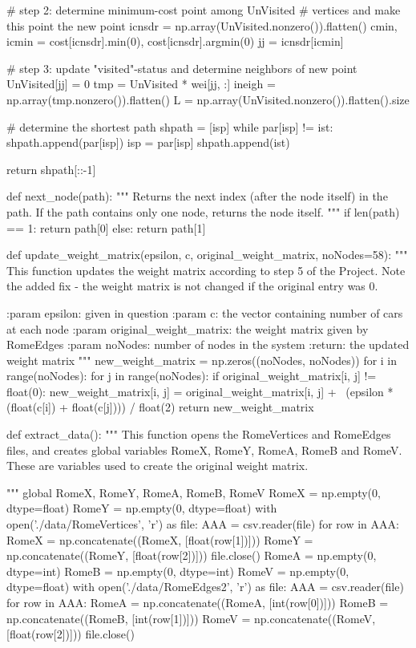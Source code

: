 \documentclass[paper=a4, fontsize=12pt]{scrartcl} %
\numberwithin{equation}{section}       %
\numberwithin{figure}{section}         %
\numberwithin{table}{section}          %
\begin{document}
\begin{python}
        # step 2: determine minimum-cost point among UnVisited
        #         vertices and make this point the new point
        icnsdr = np.array(UnVisited.nonzero()).flatten()
        cmin, icmin = cost[icnsdr].min(0), cost[icnsdr].argmin(0)
        jj = icnsdr[icmin]

        # step 3: update "visited"-status and determine neighbors of new point
        UnVisited[jj] = 0
        tmp = UnVisited * wei[jj, :]
        ineigh = np.array(tmp.nonzero()).flatten()
        L = np.array(UnVisited.nonzero()).flatten().size

    # determine the shortest path
    shpath = [isp]
    while par[isp] != ist:
        shpath.append(par[isp])
        isp = par[isp]
    shpath.append(ist)

    return shpath[::-1]

def next_node(path):
    """ Returns the next index (after the node itself) in the path.
        If the path contains only one node, returns the node itself.
    """
    if len(path) == 1:
        return path[0]
    else:
        return path[1]


def update_weight_matrix(epsilon, c, original_weight_matrix, noNodes=58):
    """
    This function updates the weight matrix according to step 5 of the
    Project. Note the added fix - the weight matrix is not changed if
    the original entry was 0.



    :param epsilon: given in question
    :param c: the vector containing number of cars at each node
    :param original_weight_matrix: the weight matrix given by RomeEdges
    :param noNodes: number of nodes in the system
    :return: the updated weight matrix
    """
    new_weight_matrix = np.zeros((noNodes, noNodes))
    for i in range(noNodes):
        for j in range(noNodes):
            if original_weight_matrix[i, j] != float(0):
                new_weight_matrix[i, j] = original_weight_matrix[i, j] + \
                                          (epsilon * (float(c[i]) +
                                                      float(c[j]))) / float(2)
    return new_weight_matrix


def extract_data():
    """
    This function opens the RomeVertices and RomeEdges files, and creates
    global variables RomeX, RomeY, RomeA, RomeB and RomeV. These are variables
    used to create the original weight matrix.

    """
    global RomeX, RomeY, RomeA, RomeB, RomeV
    RomeX = np.empty(0, dtype=float)
    RomeY = np.empty(0, dtype=float)
    with open('./data/RomeVertices', 'r') as file:
        AAA = csv.reader(file)
        for row in AAA:
            RomeX = np.concatenate((RomeX, [float(row[1])]))
            RomeY = np.concatenate((RomeY, [float(row[2])]))
    file.close()
    RomeA = np.empty(0, dtype=int)
    RomeB = np.empty(0, dtype=int)
    RomeV = np.empty(0, dtype=float)
    with open('./data/RomeEdges2', 'r') as file:
        AAA = csv.reader(file)
        for row in AAA:
            RomeA = np.concatenate((RomeA, [int(row[0])]))
            RomeB = np.concatenate((RomeB, [int(row[1])]))
            RomeV = np.concatenate((RomeV, [float(row[2])]))
    file.close()
    

\end{python}
\end{document}
